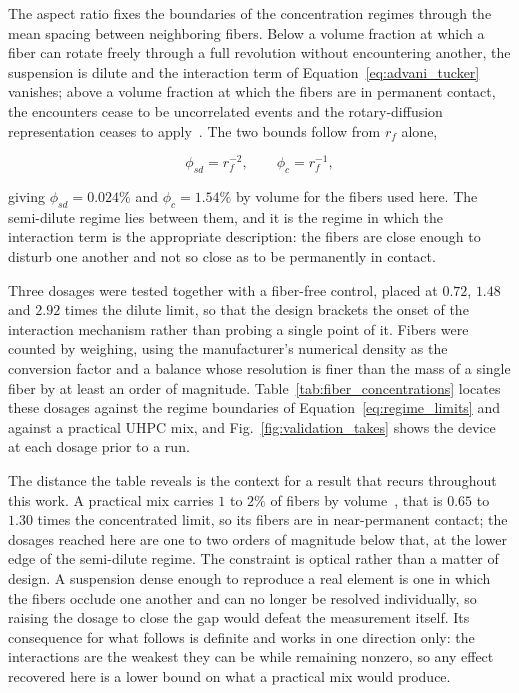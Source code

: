\documentclass[%
  aip,
  pof,          %
  reprint,      %
  floatfix
]{revtex4-2}
\begin{document}
The aspect ratio fixes the boundaries of the concentration regimes through the mean spacing between neighboring fibers. Below a volume fraction at which a fiber can rotate freely through a full revolution without encountering another, the suspension is dilute and the interaction term of Equation~\eqref{eq:advani_tucker} vanishes; above a volume fraction at which the fibers are in permanent contact, the encounters cease to be uncorrelated events and the rotary-diffusion representation ceases to apply~\cite{doi1986theory,petrie1999rheology}. The two bounds follow from $r_f$ alone,

\begin{equation}
    \phi_{sd} = r_f^{-2}, \qquad \phi_{c} = r_f^{-1},
    \label{eq:regime_limits}
\end{equation}

giving $\phi_{sd} = 0.024\%$ and $\phi_c = 1.54\%$ by volume for the fibers used here. The semi-dilute regime lies between them, and it is the regime in which the interaction term is the appropriate description: the fibers are close enough to disturb one another and not so close as to be permanently in contact.

Three dosages were tested together with a fiber-free control, placed at $0.72$, $1.48$ and $2.92$ times the dilute limit, so that the design brackets the onset of the interaction mechanism rather than probing a single point of it. Fibers were counted by weighing, using the manufacturer's numerical density as the conversion factor and a balance whose resolution is finer than the mass of a single fiber by at least an order of magnitude. Table~\ref{tab:fiber_concentrations} locates these dosages against the regime boundaries of Equation~\eqref{eq:regime_limits} and against a practical UHPC mix, and Fig.~\ref{fig:validation_takes} shows the device at each dosage prior to a run.

The distance the table reveals is the context for a result that recurs throughout this work. A practical mix carries $1$ to $2\%$ of fibers by volume~\cite{luo2023fiber}, that is $0.65$ to $1.30$ times the concentrated limit, so its fibers are in near-permanent contact; the dosages reached here are one to two orders of magnitude below that, at the lower edge of the semi-dilute regime. The constraint is optical rather than a matter of design. A suspension dense enough to reproduce a real element is one in which the fibers occlude one another and can no longer be resolved individually, so raising the dosage to close the gap would defeat the measurement itself. Its consequence for what follows is definite and works in one direction only: the interactions are the weakest they can be while remaining nonzero, so any effect recovered here is a lower bound on what a practical mix would produce.
\end{document}
